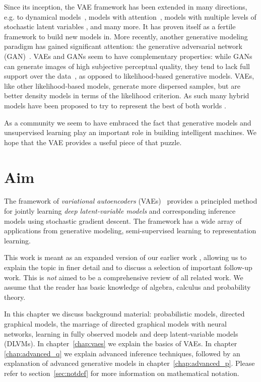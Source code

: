 \documentclass[MAL,biber]{nowfnt} %
\begin{document}
Since its inception, the VAE framework has been extended in many directions, e.g. to dynamical models~\citep{johnson2016composing}, models with attention~\citep{gregor2015draw}, models with multiple levels of stochastic latent variables \citep{kingma2016improving}, and many more. It has proven itself as a fertile framework to build new models in. More recently, another generative modeling paradigm has gained significant attention: the generative adversarial network (GAN)~\citep{goodfellow2014generative}. VAEs and GANs seem to have complementary properties: while GANs can generate images of high subjective perceptual quality, they tend to lack full support over the data~\citep{grover2018flow}, as opposed to likelihood-based generative models. VAEs, like other likelihood-based models, generate more dispersed samples, but are better density models in terms of the likelihood criterion. As such many hybrid models have been proposed to try to represent the best of both worlds \citep{dumoulin2016adversarially,grover2018flow,rosca2018distribution}.

As a community we seem to have embraced the fact that generative models and unsupervised learning play an important role in building intelligent machines. We hope that the VAE provides a useful piece of that puzzle. 


\section{Aim}

The framework of \emph{variational autoencoders} (VAEs)~\citep{kingma2013auto,rezende2014stochastic} provides a principled method for jointly learning \emph{deep latent-variable models} and corresponding inference models using stochastic gradient descent. The framework has a wide array of applications from generative modeling, semi-supervised learning to representation learning. 

This work is meant as an expanded version of our earlier work \citep{kingma2013auto}, allowing us to explain the topic in finer detail and to discuss a selection of important follow-up work. This is \emph{not} aimed to be a comprehensive review of all related work. We assume that the reader has basic knowledge of algebra, calculus and probability theory.

In this chapter we discuss background material: probabilistic models, directed graphical models, the marriage of directed graphical models with neural networks, learning in fully observed models and deep latent-variable models (DLVMs). In chapter~\ref{chap:vaes} we explain the basics of VAEs. In chapter \ref{chap:advanced_q} we explain advanced inference techniques, followed by an explanation of advanced generative models in chapter~\ref{chap:advanced_p}.  Please refer to section~\ref{sec:notdef} for more information on mathematical notation.
\end{document}
